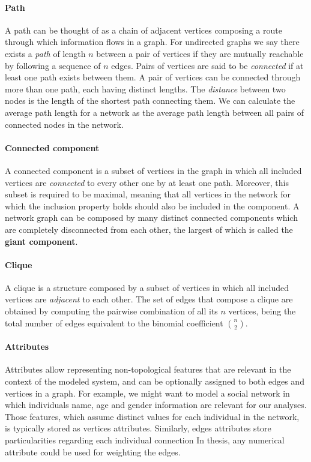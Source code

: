 \paragraph*{Path}
A path can be thought of as a chain of adjacent vertices composing a route through which information flows in a graph.
For undirected graphs we say there exists a \textit{path} of length $n$ between a pair of vertices if they are mutually reachable by following a sequence of $n$ edges.
Pairs of vertices are said to be \textit{connected} if at least one path exists between them.
A pair of vertices can be connected through more than one path, each having distinct lengths.
The \textit{distance} between two nodes is the length of the shortest path connecting them.
We can calculate the average path length for a network as the average path length between all pairs of connected nodes in the network.

\paragraph*{Connected component}
A connected component is a subset of vertices in the graph in which all included vertices are \textit{connected} to every other one by at least one path.
Moreover, this subset is required to be maximal, meaning that all vertices in the network for which the inclusion property holds should also be included in the component. 
A network graph can be composed by many distinct connected components which are completely disconnected from each other, the largest of which is called the \textbf{giant component}.

\paragraph*{Clique}
A clique is a structure composed by a subset of vertices in which all included vertices are \textit{adjacent} to each other.
The set of edges that compose a clique are obtained by computing the pairwise combination of all its $n$ vertices, being the total number of edges equivalent to the binomial coefficient $\binom{n}{2}$.


\paragraph*{Attributes}
Attributes allow representing non-topological features that are relevant in the context of the modeled system, and can be optionally assigned to both edges and vertices in a graph.
For example, we might want to model a social network in which individuals name, age and gender information are relevant for our analyses.
Those features, which assume distinct values for each individual in the network, is typically stored as vertices attributes.
Similarly, edges attributes store particularities regarding each individual connection
In thesis, any numerical attribute could be used for weighting the edges.

